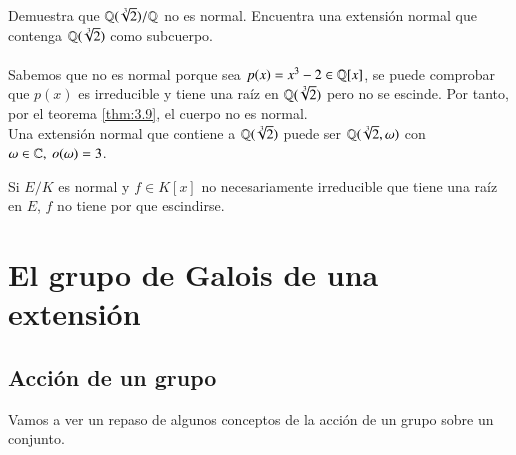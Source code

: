 \begin{ex}[H3.6]
    Demuestra que $\mathbb{Q}(\sqrt[3]{2})/\mathbb{Q}$ no es normal. Encuentra una extensión normal que contenga $\mathbb{Q}(\sqrt[3]{2})$ como subcuerpo.\\\\

    Sabemos que no es normal porque sea $p(x) = x^3 - 2 \in \mathbb{Q}[x]$, se puede comprobar que $p(x)$ es irreducible y tiene una raíz en $\mathbb{Q}(\sqrt[3]{2})$ pero no se escinde. Por tanto, por el teorema \ref{thm:3.9}, el cuerpo no es normal.\\
    Una extensión normal que contiene a $\mathbb{Q}(\sqrt[3]{2})$ puede ser $\mathbb{Q}(\sqrt[3]{2}, \omega)$ con $\omega \in \mathbb{C},\ o(\omega) = 3$.
\end{ex}

\begin{obs}
    Si $E/K$ es normal y $f\in K[x]$ no necesariamente irreducible que tiene una raíz en $E$, $f$ no tiene por que escindirse.
\end{obs}

\section{El grupo de Galois de una extensi\'on}

\subsection{Acción de un grupo}

Vamos a ver un repaso de algunos conceptos de la acción de un grupo sobre un conjunto.

